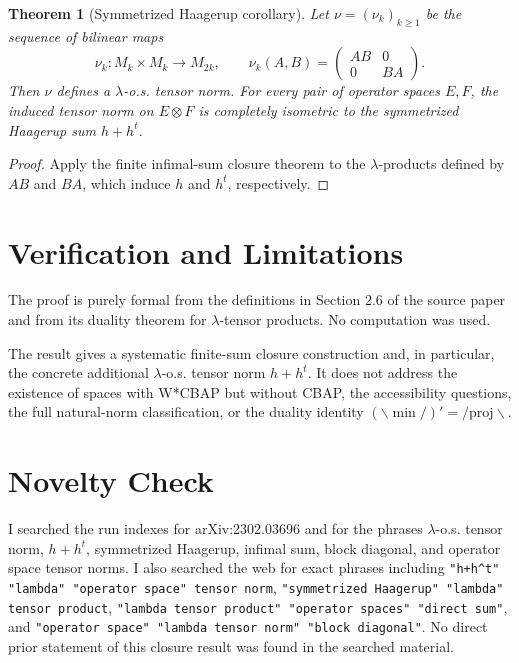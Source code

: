 \documentclass[11pt]{article}
\newtheorem{theorem}{Theorem}
\begin{document}
\begin{theorem}[Symmetrized Haagerup corollary]
Let \(\nu=(\nu_k)_{k\ge 1}\) be the sequence of bilinear maps
\[
  \nu_k:M_k\times M_k\longrightarrow M_{2k},\qquad
  \nu_k(A,B)=
  \begin{pmatrix}
  AB & 0\\
  0 & BA
  \end{pmatrix}.
\]
Then \(\nu\) defines a \(\lambda\)-o.s. tensor norm.  For every pair of
operator spaces \(E,F\), the induced tensor norm on \(E\otimes F\) is
completely isometric to the symmetrized Haagerup sum \(h+h^t\).
\end{theorem}

\begin{proof}
Apply the finite infimal-sum closure theorem to the \(\lambda\)-products
defined by \(AB\) and \(BA\), which induce \(h\) and \(h^t\), respectively.
\end{proof}

\section*{Verification and Limitations}

The proof is purely formal from the definitions in Section 2.6 of the source
paper and from its duality theorem for \(\lambda\)-tensor products.  No
computation was used.

The result gives a systematic finite-sum closure construction and, in
particular, the concrete additional \(\lambda\)-o.s. tensor norm \(h+h^t\).
It does not address the existence of spaces with W*CBAP but without CBAP, the
accessibility questions, the full natural-norm classification, or the duality
identity \((\backslash\min /)'=/\mathrm{proj}\backslash\).

\section*{Novelty Check}

I searched the run indexes for arXiv:2302.03696 and for the phrases
\(\lambda\)-o.s. tensor norm, \(h+h^t\), symmetrized Haagerup, infimal sum,
block diagonal, and operator space tensor norms.  I also searched the web for
exact phrases including \texttt{"h+h\^{}t" "lambda" "operator space" tensor
norm}, \texttt{"symmetrized Haagerup" "lambda" tensor product},
\texttt{"lambda tensor product" "operator spaces" "direct sum"}, and
\texttt{"operator space" "lambda tensor norm" "block diagonal"}.  No direct
prior statement of this closure result was found in the searched material.
\end{document}
